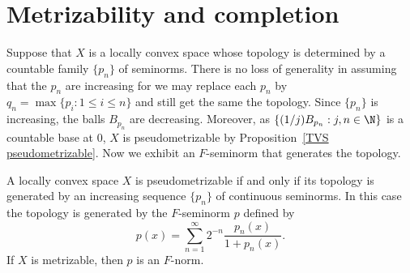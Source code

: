 \section{Metrizability and completion}
Suppose that $X$ is a locally convex space whose topology is determined by a countable family $\{p_n\}$ of seminorms. There is no loss of generality in assuming that the $p_n$ are increasing for we may replace each $p_n$ by $q_n=\max\{p_i:1\leq i\leq n\}$ and still get the same the topology. Since $\{p_n\}$ is increasing, the balls $B_{p_n}$ are decreasing. Moreover, as $\{(1/j)B_{p_n}:j,n\in\N\}$ is a countable base at $0$, $X$ is pseudometrizable by Proposition~\ref{TVS pseudometrizable}. Now we exhibit an $F$-seminorm that generates the topology.
\begin{theorem}\label{LCS metrizable iff}
A locally convex space $X$ is pseudometrizable if and only if its topology is generated by an increasing sequence $\{p_n\}$ of continuous seminorms. In this case the topology is generated by the $F$-seminorm $p$ defined by 
\[p(x)=\sum_{n=1}^{\infty}2^{-n}\frac{p_n(x)}{1+p_n(x)}.\]
If $X$ is metrizable, then $p$ is an $F$-norm.
\end{theorem}
